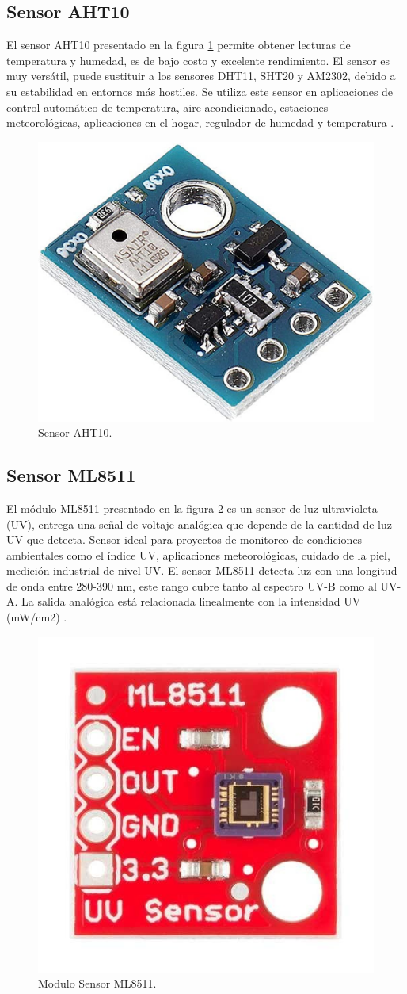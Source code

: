 \subsection{Sensor AHT10}
El sensor AHT10 presentado en la figura \ref{fig:SensorAHT10} permite obtener lecturas de temperatura y humedad, es de bajo costo y excelente rendimiento. El sensor es muy versátil, puede sustituir a los sensores DHT11, SHT20 y AM2302, debido a su estabilidad en entornos más hostiles. Se utiliza este sensor en aplicaciones de control automático de temperatura, aire acondicionado, estaciones meteorológicas, aplicaciones en el hogar, regulador de humedad y temperatura \citep{ModuloAHT10}.
\begin{figure}[htbp]
	\centering
	\includegraphics[width=.3\textwidth]{./Figures/aht10.jpg}
	\caption{Sensor AHT10.}
	\label{fig:SensorAHT10}
\end{figure}

\subsection{Sensor ML8511}

El módulo ML8511 presentado en la figura \ref{fig:SensorML8511} es un sensor de luz ultravioleta (UV), entrega una señal de voltaje analógica que depende de la cantidad de luz UV que detecta. Sensor ideal para proyectos de monitoreo de condiciones ambientales como el índice UV, aplicaciones meteorológicas, cuidado de la piel, medición industrial de nivel UV.
El sensor ML8511 detecta luz con una longitud de onda entre 280-390 nm, este rango cubre tanto al espectro UV-B como al UV-A. La salida analógica está relacionada linealmente con la intensidad UV (mW/cm2) \citep{ModuloML8511}.
\begin{figure}[htbp]
	\centering
	\includegraphics[width=.3\textwidth]{./Figures/ml8511.jpg}
	\caption{Modulo Sensor ML8511.}
	\label{fig:SensorML8511}
\end{figure}
